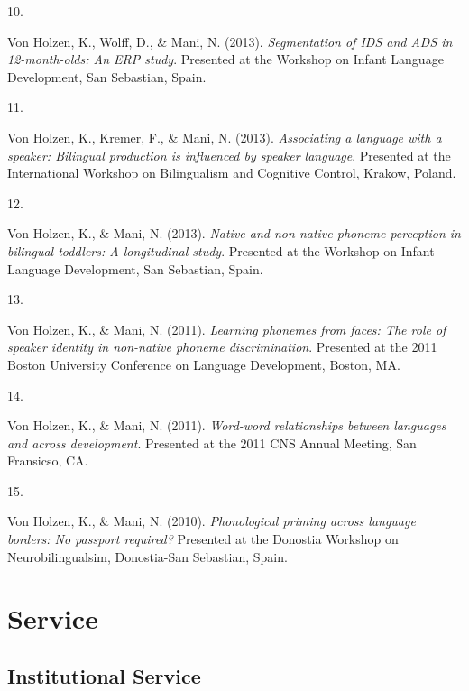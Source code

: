 \documentclass[10pt,a4paper,]{article}
\newlength{\cslhangindent}
\newlength{\csllabelwidth}
\newcommand{\CSLLeftMargin}[1]{\parbox[t]{\csllabelwidth}{\hfill #1~}}
\newcommand{\CSLRightInline}[1]{\parbox[t]{\linewidth - \cslhangindent - \csllabelwidth}{#1}\vspace{0.8ex}}
\begin{document}
\leavevmode{}%
\CSLLeftMargin{10. }%
\CSLRightInline{Von Holzen, K., Wolff, D., \& Mani, N. (2013).
\emph{Segmentation of IDS and ADS in 12-month-olds: An ERP study}.
Presented at the Workshop on Infant Language Development, San Sebastian,
Spain.}

\leavevmode{}%
\CSLLeftMargin{11. }%
\CSLRightInline{Von Holzen, K., Kremer, F., \& Mani, N. (2013).
\emph{Associating a language with a speaker: Bilingual production is
influenced by speaker language}. Presented at the International Workshop
on Bilingualism and Cognitive Control, Krakow, Poland.}

\leavevmode{}%
\CSLLeftMargin{12. }%
\CSLRightInline{Von Holzen, K., \& Mani, N. (2013). \emph{Native and
non-native phoneme perception in bilingual toddlers: A longitudinal
study}. Presented at the Workshop on Infant Language Development, San
Sebastian, Spain.}

\leavevmode{}%
\CSLLeftMargin{13. }%
\CSLRightInline{Von Holzen, K., \& Mani, N. (2011). \emph{Learning
phonemes from faces: The role of speaker identity in non-native phoneme
discrimination}. Presented at the 2011 Boston University Conference on
Language Development, Boston, MA.}

\leavevmode{}%
\CSLLeftMargin{14. }%
\CSLRightInline{Von Holzen, K., \& Mani, N. (2011). \emph{Word-word
relationships between languages and across development}. Presented at
the 2011 CNS Annual Meeting, San Fransicso, CA.}

\leavevmode{}%
\CSLLeftMargin{15. }%
\CSLRightInline{Von Holzen, K., \& Mani, N. (2010). \emph{Phonological
priming across language borders: No passport required?} Presented at the
Donostia Workshop on Neurobilingualsim, Donostia-San Sebastian, Spain.}

\hypertarget{service}{%
\section{Service}\label{service}}

\hypertarget{institutional-service}{%
\subsection{Institutional Service}\label{institutional-service}}
\end{document}
